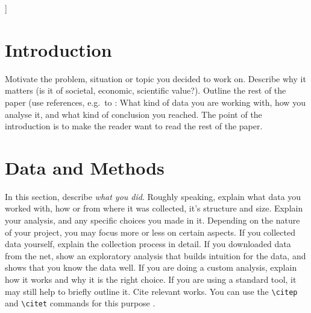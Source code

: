 \documentclass{article}
\begin{document}

\vskip 0.3in
]



\printAffiliationsAndNotice{\icmlEqualContribution} %

\begin{abstract}
Put your abstract here. Abstracts typically start with a sentence motivating why the subject is interesting. Then mention the data, methodology or methods you are working with, and describe results. 
\end{abstract}

\section{Introduction}\label{sec:intro}

Motivate the problem, situation or topic you decided to work on. Describe why it matters (is it of societal, economic, scientific value?). Outline the rest of the paper (use references, e.g.~to : What kind of data you are working with, how you analyse it, and what kind of conclusion you reached. The point of the introduction is to make the reader want to read the rest of the paper.

\section{Data and Methods}\label{sec:methods}

In this section, describe \emph{what you did}. Roughly speaking, explain what data you worked with, how or from where it was collected, it's structure and size. Explain your analysis, and any specific choices you made in it. Depending on the nature of your project, you may focus more or less on certain aspects. If you collected data yourself, explain the collection process in detail. If you downloaded data from the net, show an exploratory analysis that builds intuition for the data, and shows that you know the data well. If you are doing a custom analysis, explain how it works and why it is the right choice. If you are using a standard tool, it may still help to briefly outline it. Cite relevant works. You can use the \verb|\citep| and \verb|\citet| commands for this purpose \citep{mackay2003information}.
\end{document}
